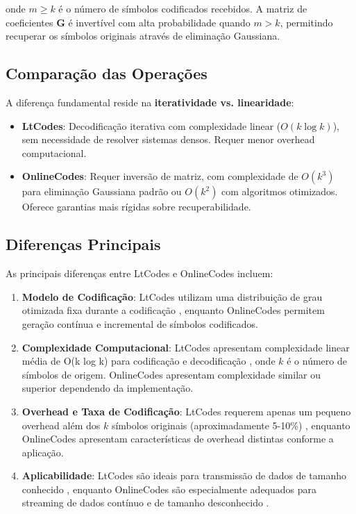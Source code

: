 onde $m \geq k$ é o número de símbolos codificados recebidos. A matriz de coeficientes $\mathbf{G}$ é invertível com alta probabilidade 
quando $m > k$, permitindo recuperar os símbolos originais através de eliminação Gaussiana.

\subsection{Comparação das Operações}

A diferença fundamental reside na \textbf{iteratividade vs. linearidade}:
\begin{itemize}
    \item \textbf{LtCodes}: Decodificação iterativa com complexidade linear ($O(k \log k)$), sem necessidade de resolver sistemas densos. Requer 
	menor overhead computacional.
    
    \item \textbf{OnlineCodes}: Requer inversão de matriz, com complexidade de $O(k^3)$ para eliminação Gaussiana padrão ou $O(k^2)$ com algoritmos 
	otimizados. Oferece garantias mais rígidas sobre recuperabilidade.
\end{itemize}

\subsection{Diferenças Principais}

As principais diferenças entre LtCodes e OnlineCodes incluem:

\begin{enumerate}
    \item \textbf{Modelo de Codificação}: LtCodes utilizam uma distribuição de grau otimizada fixa durante a codificação \cite{luby2002lt}, enquanto OnlineCodes 
    permitem geração contínua e incremental de símbolos codificados.
    
    \item \textbf{Complexidade Computacional}: LtCodes apresentam complexidade linear média de O(k log k) para codificação e decodificação \cite{karp2004finite}, onde 
    $k$ é o número de símbolos de origem. OnlineCodes apresentam complexidade similar ou superior dependendo da implementação.
    
    \item \textbf{Overhead e Taxa de Codificação}: LtCodes requerem apenas um pequeno overhead além dos $k$ símbolos originais (aproximadamente 5-10\%) \cite{luby2002lt}, 
    enquanto OnlineCodes apresentam características de overhead distintas conforme a aplicação.
    
    \item \textbf{Aplicabilidade}: LtCodes são ideais para transmissão de dados de tamanho conhecido \cite{luby2002lt}, enquanto OnlineCodes são especialmente adequados 
    para streaming de dados contínuo e de tamanho desconhecido \cite{fountain2007introduction}.
\end{enumerate}


